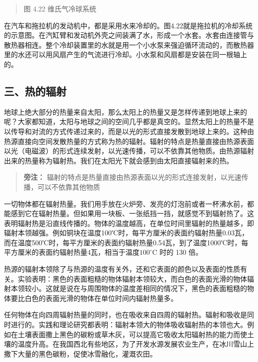 \begin{quote}
图 4.22 维氏气冷球系统
\end{quote}

在汽车和拖拉机的发动机中，都是采用水来冷却的。图4.22就是拖拉机的冷却系统的示意图。在汽缸臂和发动机外壳之间装满了水，形成一个水套。水套由连接管与散热器相连。整个冷却装置里的水就是用一个小水泵来强迫循环流动的，而散热器里的水还可以用风扇产生的气流进行冷却。小水泵和风扇都是安装在同一根轴上的。

\subsection{三、热的辐射}\label{ux4e09ux70edux7684ux8f90ux5c04}

地球上绝大部分的热量来自太阳，那么太阳上的热量又是怎样传递到地球上来的呢？大家都知道，太阳与地球之间的空间几乎都是真空的。显然太阳上的热量不是以传导和对流的方式传递过来的，而是以光的形式直接发散到地球上来的。这种由热源直接向空间发散热量的方式称为热的辐射。辐射的特点是热量直接由热源表面以光（电磁波）的形式连续发射，以光速传播，可以不依靠其他物质。由热源辐射出来的热量称为辐射热。我们在太阳光下就会感到由太阳直接辐射来的热。

\begin{quote}
\textbf{旁注：}
辐射的特点是热量直接由热源表面以光的形式连接发射，以光速传播，可以不依靠其他物质
\end{quote}

一切物体都在辐射热量。我们用手放在火炉旁、发亮的灯泡前或者一杯沸水前，都能感到它在辐射热量。但如果用一块板、一张纸挡一挡，就感觉不到辐射热了。这表明辐射热是沿直线传播的。物体的温度越高，在单位时间里辐射的热量越多，即辐射本领越强。例如铜块在温度100℃时，每平方厘米的表面约辐射热量0.03瓦，而在温度500℃时，每平方厘米的表面约辐射热量0.54瓦，到了温度1000℃时，每平方厘米的表面约辐射热量4瓦，相当于温度\(100^{\circ}\)C
时的 130 倍。

热源的辐射本领除了与热源的温度有关外，还和它表面的颜色以及表面的性质有关。实验表明：黑色的表面粗糙的物体辐射本领较大，而白色的表面光滑的物体辐射本领较小。这就是说在与周围物体的温度差相同的情况下，黑色的表面粗糙的物体要比白色的表面光滑的物体在单位时间内辐射热量多。

任何物体在向四周辐射热量的同时，也在吸收来自四周的辐射热。辐射和吸收是同时进行的。实践和理论研究都表明：辐射本领大的物体吸收辐射热的本领也大。例如在土壤表面撒上黑色的碳粉或草木灰，可以提高它吸收太阳辐射热的能力而使土壤的温度升高。在我国西北有些地区，为了开发水源发展农业生产，在冰川雪山上撒下大量的黑色碳粉，促使冰雪融化，灌溉农田。

